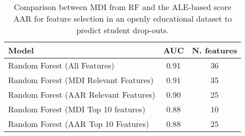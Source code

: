 \begin{table}[ht]
\caption{Comparison between MDI from RF and the ALE-based score AAR for feature selection in an openly educational dataset to predict student drop-outs.}
\label{tbl:feature_selection_edu}
\centering
{}
\begin{tabular}{l|c|c}
\toprule
Model & AUC & N. features \\
\midrule
Random Forest (All Features) & 0.91 & 36 \\
Random Forest (MDI Relevant Features) & 0.91 & 35 \\
Random Forest (AAR Relevant Features) & 0.90 & 25 \\
Random Forest (MDI Top 10 features) & 0.88 & 10 \\
Random Forest (AAR Top 10 Features) & 0.88 & 25 \\
\bottomrule
\end{tabular}
\end{table}

